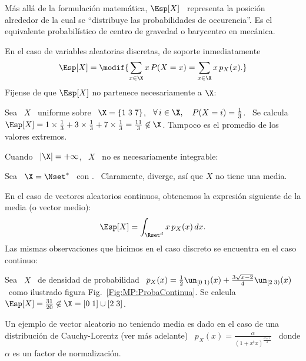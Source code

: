 M\'as  all\'a  de  la formulaci\'on  matem\'atica,
$\Esp[X]$ \  representa la posici\'on alrededor  de la cual  se ``distribuye las
probabilidades de occurencia''. Es  el equivalente probabil\'istico de centro de
gravedad o barycentro en mec\'anica.

En el  caso de variables  aleatorias discretas, de soporte   inmediatamente
%
\[
\Esp[X] = \modif{\sum_{x \in \X} x \, P(X = x) = \sum_{x \in \X} x \, p_X(x).}
\]
%
\noindent  Fijense de  que $\Esp[X]$  no partenece  necesariamente a  $\X$:
%
\begin{ejemplo}
\label{Ej:MP:Uniforme3Estados}
%
  Sea \  $X$ \  uniforme sobre \  $\X = \{  1 \; 3  \; 7 \}$,  \ie \
  $\forall \,  i \in \X, \quad  P(X = i) =  \frac13$. \ Se calcula  $\Esp[X] = 1
  \times \frac13  + 3 \times \frac13  + 7 \times \frac13  = \frac{11}{3} \not\in
  \X$.  Tampoco es el promedio de los valores extremos.
\end{ejemplo}
%
\noindent Cuando \ $|\X| = +\infty$, \ $X$ \ no es necesariamente integrable:
%
\begin{ejemplo}
\label{Ej:MP:DiscretaSinMedia}
%
Sea  \ $\X  = \Nset^*$  \ con  . \
Claramente,  diverge, as\'i que $X$ no tiene
una media.
\end{ejemplo}

En el caso de vectores  aleatorios continuos, obtenemos la expresi\'on siguiente
de la media (o vector medio):
%
\[
\Esp[X] = \int_{\Rset^d} x \, p_X(x) \, dx.
\]
%
\noindent Las mismas observaciones que  hicimos en el caso discreto se encuentra
en el caso continuo:
%
\begin{ejemplo}
\label{Ej:MP:MediaNoEnX}
%
Sea \ $X$ \ de densidad de  probabilidad \ $p_X(x) = \frac12 \un_{[0 \; 1)}(x) +
\frac{3   \sqrt{x-2}}{4}   \un_{[2   \;   3)}(x)$  \   como   ilustrado   figura
Fig.~\ref{Fig:MP:ProbaContinua}.
Se calcula \ $\Esp[X] = \frac{31}{20} \not\in \X = [0 \; 1] \cup [2 \; 3]$.
\end{ejemplo}
%
\begin{ejemplo}
\label{Ej:MP:VariableCauchySinMedia}
%
  Un ejemplo  de vector aleatorio no  teniendo media es  dado en el caso  de una
  distribuci\'on de Cauchy-Lorentz (ver  m\'as adelante) \ $\displaystyle p_X(x)
  = \frac{\alpha}{\left( 1 + x^t x \right)^{\frac{d+1}{2}}}$ \ donde $\alpha$ es
  un factor de normalizaci\'on.
\end{ejemplo}

